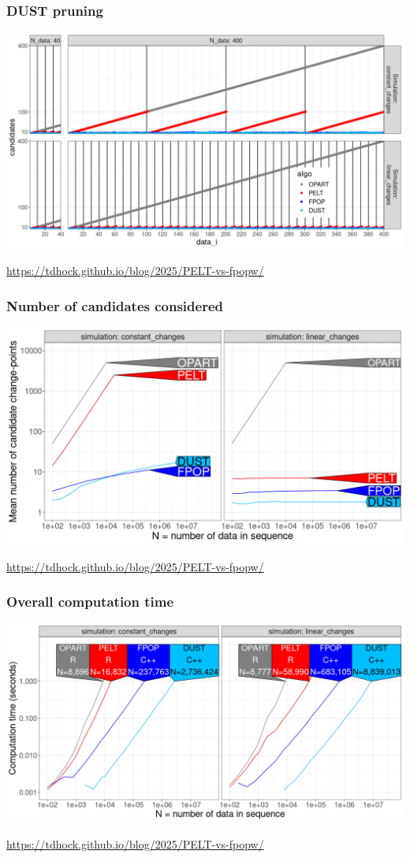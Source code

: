 \documentclass{beamer}
\begin{document}
\begin{frame}
  \frametitle{DUST pruning}
  \includegraphics[width=\textwidth]{dust-prune-1.png}

  \url{https://tdhock.github.io/blog/2025/PELT-vs-fpopw/}
\end{frame}

\begin{frame}
  \frametitle{Number of candidates considered}
  \includegraphics[width=\textwidth]{figure-pred-candidates.png}

  \url{https://tdhock.github.io/blog/2025/PELT-vs-fpopw/}
\end{frame}

\begin{frame}
  \frametitle{Overall computation time}
  \includegraphics[width=\textwidth]{figure-pred-seconds.png}

  \url{https://tdhock.github.io/blog/2025/PELT-vs-fpopw/}
\end{frame}
\end{document}
